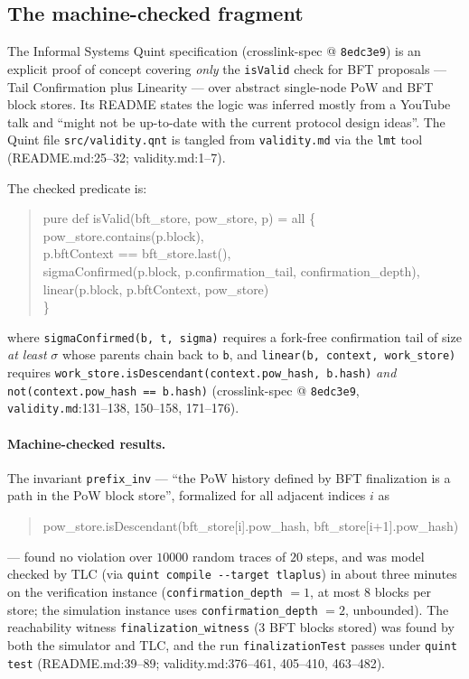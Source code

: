 \documentclass[11pt,a4paper]{article}
\theoremstyle{definition}
\begin{document}
\subsection{The machine-checked fragment}\label{sec:xl-quint}

The Informal Systems Quint specification (crosslink-spec @
\texttt{8edc3e9}) is an explicit proof of concept covering \emph{only}
the \texttt{isValid} check for BFT proposals --- Tail Confirmation plus
Linearity --- over abstract single-node PoW and BFT block stores. Its
README states the logic was inferred mostly from a YouTube talk and
``might not be up-to-date with the current protocol design ideas''. The
Quint file \texttt{src/validity.qnt} is tangled from
\texttt{validity.md} via the \texttt{lmt} tool (README.md:25--32;
validity.md:1--7).

The checked predicate is:
\begin{quote}\ttfamily\small
pure def isValid(bft\_store, pow\_store, p) = all \{\\
\hspace*{1.5em}pow\_store.contains(p.block),\\
\hspace*{1.5em}p.bftContext == bft\_store.last(),\\
\hspace*{1.5em}sigmaConfirmed(p.block, p.confirmation\_tail,
confirmation\_depth),\\
\hspace*{1.5em}linear(p.block, p.bftContext, pow\_store)\\
\}
\end{quote}
where \texttt{sigmaConfirmed(b, t, sigma)} requires a fork-free
confirmation tail of size \emph{at least} $\sigma$ whose parents chain
back to \texttt{b}, and \texttt{linear(b, context, work\_store)} requires
\texttt{work\_store.isDescendant(context.pow\_hash, b.hash)} \emph{and}
\texttt{not(context.pow\_hash == b.hash)} (crosslink-spec @
\texttt{8edc3e9}, \texttt{validity.md}:131--138, 150--158, 171--176).

\paragraph{Machine-checked results.} The invariant \texttt{prefix\_inv}
--- ``the PoW history defined by BFT finalization is a path in the PoW
block store'', formalized for all adjacent indices $i$ as
\begin{quote}\ttfamily\small
pow\_store.isDescendant(bft\_store[i].pow\_hash,
bft\_store[i+1].pow\_hash)
\end{quote}
--- found no
violation over $10000$ random traces of $20$ steps, and was model checked
by TLC (via \texttt{quint compile -{}-target tlaplus}) in about three
minutes on the verification instance (\texttt{confirmation\_depth} $= 1$,
at most $8$ blocks per store; the simulation instance uses
\texttt{confirmation\_depth} $= 2$, unbounded). The reachability witness
\texttt{finalization\_witness} ($3$ BFT blocks stored) was found by both
the simulator and TLC, and the run \texttt{finalizationTest} passes under
\texttt{quint test} (README.md:39--89; validity.md:376--461, 405--410,
463--482).
\end{document}
